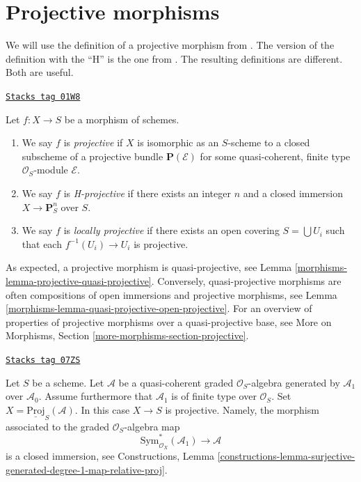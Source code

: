\section{Projective morphisms}
\label{morphisms-section-projective}
We will use the definition of a projective morphism from \cite{EGA}.
The version of the definition with the ``H'' is the one
from \cite{H}. The resulting definitions are different. Both are useful.

\begin{definition}[Projective]
\label{morphisms-definition-projective}
\href{https://stacks.math.columbia.edu/tag/01W8}{\texttt{Stacks tag 01W8}}

Let $f : X \to S$ be a morphism of schemes.
\begin{enumerate}
\item We say $f$ is {\it projective} if $X$ is isomorphic as
an $S$-scheme to a closed subscheme of a projective
bundle $\mathbf{P}(\mathcal{E})$
for some quasi-coherent, finite type $\mathcal{O}_S$-module $\mathcal{E}$.
\item We say $f$ is {\it H-projective} if there exists an integer $n$ and
a closed immersion $X \to \mathbf{P}^n_S$ over $S$.
\item We say $f$ is {\it locally projective} if there exists an open
covering $S = \bigcup U_i$ such that each $f^{-1}(U_i) \to U_i$ is
projective.
\end{enumerate}
\end{definition}

As expected, a projective morphism is quasi-projective, see
Lemma \ref{morphisms-lemma-projective-quasi-projective}.
Conversely, quasi-projective morphisms are often compositions
of open immersions and projective morphisms, see
Lemma \ref{morphisms-lemma-quasi-projective-open-projective}.
For an overview of properties of projective morphisms over
a quasi-projective base, see
More on Morphisms, Section \ref{more-morphisms-section-projective}.

\begin{example}[Projective]
\label{morphisms-example-projective}
\href{https://stacks.math.columbia.edu/tag/07ZS}{\texttt{Stacks tag 07ZS}}

Let $S$ be a scheme. Let $\mathcal{A}$ be a quasi-coherent graded
$\mathcal{O}_S$-algebra generated by $\mathcal{A}_1$ over $\mathcal{A}_0$.
Assume furthermore that $\mathcal{A}_1$ is of finite type over
$\mathcal{O}_S$. Set $X = \underline{\text{Proj}}_S(\mathcal{A})$.
In this case $X \to S$ is projective. Namely,
the morphism associated to the graded $\mathcal{O}_S$-algebra map
$$
\text{Sym}_{\mathcal{O}_X}^*(\mathcal{A}_1)
\longrightarrow
\mathcal{A}
$$
is a closed immersion, see
Constructions, Lemma
\ref{constructions-lemma-surjective-generated-degree-1-map-relative-proj}.
\end{example}


